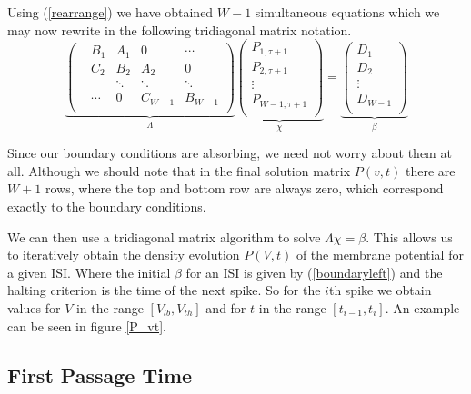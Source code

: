 \documentclass[10pt]{article}
\begin{document}
Using (\ref{rearrange}) we have obtained $W-1$ simultaneous equations which
we may now rewrite in the following tridiagonal matrix notation.
\begin{equation}
\underbrace{
\begin{pmatrix}
    & B_1   & A_1    & 0      & \cdots   \\
    & C_2   & B_2    & A_2    & 0        \\
    &       & \ddots & \ddots & \ddots   \\
    & \cdots & 0      & C_{W-1}& B_{W-1} \\
\end{pmatrix}}_{\Lambda}
\underbrace{
\begin{pmatrix}
    P_{1,\tau+1}   \\
    P_{2,\tau+1}   \\
    \vdots         \\
    P_{W-1,\tau+1} \\
\end{pmatrix}}_{\chi}
=
\underbrace{
\begin{pmatrix}
    D_1     \\
    D_2     \\
    \vdots  \\
    D_{W-1} \\
\end{pmatrix}}_{\beta}
\end{equation}

Since our boundary conditions are absorbing, we need not worry about them at
all. Although we should note that  in the final solution matrix $P(v,t)$ there
are $W+1$ rows, where the top and bottom row are always zero, which correspond
exactly to the boundary conditions.


We can then use a tridiagonal matrix algorithm to solve $\Lambda \chi
= \beta$. This allows us to iteratively obtain the density evolution $P(V,t)$ of the
membrane potential for a given ISI. Where the initial $\beta$ for an ISI is given by
(\ref{boundaryleft}) and the halting criterion is the time of the next
spike. So for the $i$th spike we obtain values for $V$ in the range
$[V_{lb}, V_{th}]$ and for $t$ in the range $[t_{i-1},t_{i}]$. An
example can be seen in figure \ref{P_vt}.


\subsection{First Passage Time}
\end{document}

